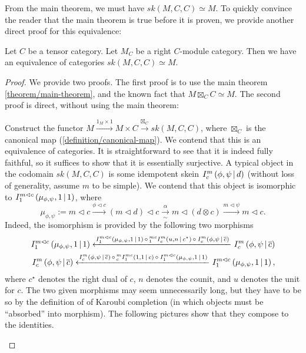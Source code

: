 \noindent From the main theorem, we must have $sk(M,C,C) \simeq M$. To quickly
convince the reader that the main theorem is true before it is proven, we
provide another direct proof for this equivalence:

\begin{proposition} \label{proposition/degenerated-main-theorem}

  \noindent Let $C$ be a tensor category. Let $M_{C}$ be a right $C$-module
  category. \quad Then we have an equivalence of categories
  $sk(M,C,C) \simeq M$.
\end{proposition}

\begin{proof}
  We provide two proofs. The first proof is to use the main theorem
  \ref{theorem/main-theorem}, and the known fact that
  $M \boxtimes_{C} C \simeq M$. The second proof is direct, without using the
  main theorem:

  Construct the functor
  $M \xrightarrow{1_{M} \times 1} M \times C \xrightarrow{\boxtimes_{C}} sk(M,C,C)$,
  where $\boxtimes_{C}$ is the canonical map (\ref{definition/canonical-map}).
  We contend that this is an equivalence of categories. It is straightforward
  to see that it is indeed fully faithful, so it suffices to show that it is
  essentially surjective. A typical object in the codomain $sk(M,C,C)$ is some
  idempotent skein ${}^{}_{} I^{m}_{c} \left( \phi, \psi \,\middle|\, d \right)$ (without loss of generality,
  assume $m$ to be simple). We contend that this object is isomorphic to
  ${}^{}_{} I^{m \lhd c}_{1} \left( \mu_{\phi, \psi}, 1 \,\middle|\, 1 \right)$, where
  \[
    \mu_{\phi,\psi} :=
    m \lhd c
    \xrightarrow{\phi \lhd c}
    (m \lhd d) \lhd c
    \xrightarrow[\sim]{\alpha}
    m \lhd (d \otimes c)
    \xrightarrow{m \lhd \psi}
    m \lhd c.
  \]
  Indeed, the isomorphism is provided by the following two morphisms
  \begin{align*}
    {}^{}_{} I^{m \lhd c}_{1} \left( \mu_{\phi, \psi}, 1 \,\middle|\, 1 \right)
    \xleftarrow{
    {}^{}_{} I^{m \lhd c}_{1} \left( \mu_{\phi, \psi}, 1 \,\middle|\, 1 \right)
    \, \circ \,
    {}^{mc}_{1} I^{m}_{c} \left( u, n \,\middle|\, c^{\star} \right)
    \, \circ \,
    {}^{}_{} I^{m}_{c} \left( \phi, \psi \,\middle|\, \overline{c} \right)}
    {}^{}_{} I^{m}_{c} \left( \phi, \psi \,\middle|\, \overline{c} \right)
    \\
    {}^{}_{} I^{m}_{c} \left( \phi, \psi \,\middle|\, \overline{c} \right)
    \xleftarrow{
    {}^{}_{} I^{m}_{c} \left( \phi, \psi \,\middle|\, \overline{c} \right)
    \, \circ \,
    {}^{m}_{c} I^{mc}_{1} \left( 1, 1 \,\middle|\, c \right)
    \, \circ \,
    {}^{}_{} I^{m \lhd c}_{1} \left( \mu_{\phi, \psi}, 1 \,\middle|\, 1 \right)
    }
    {}^{}_{} I^{m \lhd c}_{1} \left( \mu_{\phi, \psi}, 1 \,\middle|\, 1 \right),
  \end{align*}
  where $c^{\star}$ denotes the right dual of $c$, $n$ denotes the counit, and
  $u$ denotes the unit for $c$. The two given morphisms may seem unnecessarily
  long, but they have to be so by the definition of of Karoubi completion (in
  which objects must be ``absorbed'' into morphism). The following pictures
  show that they compose to the identities.

  \begin{center}
    
  \end{center}
\end{proof}


